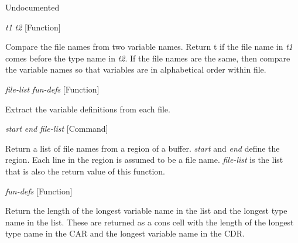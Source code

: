\begin{doc-string}
Undocumented
\end{doc-string}

\vspace{1em}
\noindent
{}
\usebox{\funcname}\emph{t1} \emph{t2}
 \hfill [Function]

\begin{doc-string}
Compare the file names from two variable names.  Return t if the file
name in \emph{t1} comes before the type name in \emph{t2}.  If the file names are the same,
then compare the variable names so that variables are in alphabetical order
within file.
\end{doc-string}

\vspace{1em}
\noindent
{}
\usebox{\funcname}\emph{file-list} \emph{fun-defs}
 \hfill [Function]

\begin{doc-string}
Extract the variable definitions from each file.
\end{doc-string}

\vspace{1em}
\noindent
{}
\usebox{\funcname}\emph{start} \emph{end} \emph{file-list}
 \hfill [Command]

\begin{doc-string}
Return a list of file names from a region of a buffer.  \emph{start} and \emph{end}
define the region.  Each line in the region is assumed to be a file name.
\emph{file-list} is the list that is also the return value of this function.
\end{doc-string}

\vspace{1em}
\noindent
{}
\usebox{\funcname}\emph{fun-defs}
 \hfill [Function]

\begin{doc-string}
 Return the length of the longest variable name in the list and the longest type
name in the list.  These are returned as a cons cell with the length of the longest
type name in the CAR and the longest variable name in the CDR.
\end{doc-string}

